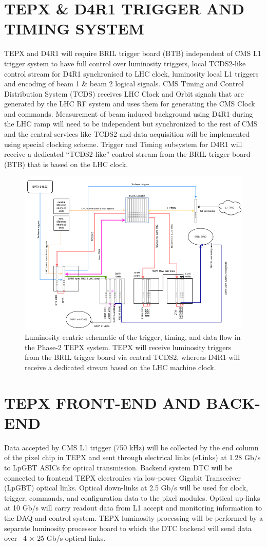 \documentclass[a4paper,11pt]{article}
\begin{document}
\section{TEPX \& D4R1 TRIGGER AND TIMING SYSTEM}
TEPX and D4R1 will require BRIL trigger board (BTB) independent of CMS L1 trigger system to have full control over luminosity triggers, local TCDS2-like control stream for D4R1 synchronised to LHC clock, luminosity local L1 triggers and encoding of beam 1 \& beam 2 logical signals. CMS Timing and Control Distribution System (TCDS) receives LHC Clock and Orbit signals that are generated by the LHC RF system and uses them for generating the CMS Clock and commands. Measurement of beam induced background using D4R1 during the LHC ramp will need to be independent but synchronized to the rest of CMS and the central services like TCDS2 and data acquisition will be implemented using special clocking
scheme. Trigger and Timing subsystem for D4R1 will receive a dedicated “TCDS2-like” control stream from the BRIL trigger board (BTB) that is based on the LHC clock.

\begin{figure}[htb]
  \centering
  \includegraphics[width=0.4\columnwidth]{BTB.png}
  \caption{Luminosity-centric schematic of the trigger, timing, and data flow in the Phase-2 TEPX system. TEPX will receive luminosity triggers from the BRIL trigger board via central TCDS2, whereas D4R1 will receive a dedicated stream based on the LHC machine clock.}
  \label{fig:CMS}
\end{figure}


\newpage
\section{TEPX FRONT-END AND BACK-END}
Data accepted by CMS L1 trigger (750 kHz) will be collected by the end column of the pixel chip in TEPX and sent through electrical links (eLinks) at 1.28 Gb/s to LpGBT ASICs for optical transmission. Backend system DTC will be connected to frontend TEPX electronics via low-power Gigabit Transceiver (LpGBT) optical links. Optical down-links at 2.5 Gb/s will be used for clock, trigger, commands, and configuration data to the pixel modules. Optical up-links at 10 Gb/s will carry readout data from L1 accept and monitoring information to the DAQ and control system. TEPX luminosity processing will be performed by a separate luminosity processor board to which the DTC backend will send data over ~4 $\times$ 25 Gb/s optical links.
\end{document}
